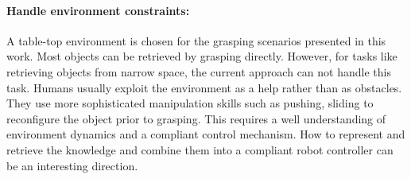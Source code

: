 \paragraph{Handle environment constraints: }

 A table-top environment is chosen for the grasping scenarios presented in this work. Most objects can be retrieved by grasping directly. However, for tasks like retrieving objects from narrow space, the current approach can not handle this task. Humans usually exploit the environment as a help rather than as obstacles. They use more sophisticated manipulation skills such as pushing, sliding to reconfigure the object prior to grasping. This requires a well understanding of environment dynamics and a compliant control mechanism. How to represent  and retrieve the knowledge and combine them into a compliant robot controller can be an interesting direction.    

